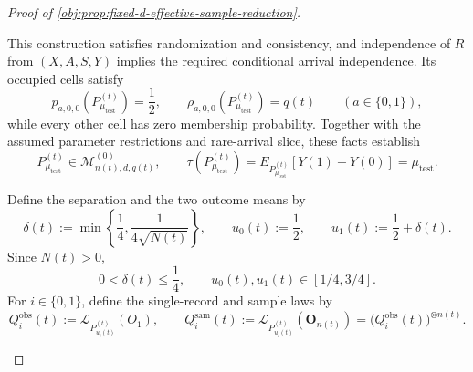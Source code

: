 \documentclass[11pt]{article}
\begin{document}
\begin{proof}[Proof of \cref{obj:prop:fixed-d-effective-sample-reduction}]
\begin{enumerate}
This construction satisfies randomization and consistency, and independence
of \(R\) from \((X,A,S,Y)\) implies the required conditional arrival independence.
Its occupied cells satisfy
\[
p_{a,0,0}(P_{\mu_{\mathrm{test}}}^{(t)})=\frac12,
\qquad
\rho_{a,0,0}(P_{\mu_{\mathrm{test}}}^{(t)})=q(t)
\qquad(a\in\{0,1\}),
\]
while every other cell has zero membership probability. Together with the
assumed parameter restrictions and rare-arrival slice, these facts establish
\[
P_{\mu_{\mathrm{test}}}^{(t)}\in\mathcal M^{(0)}_{n(t),d,q(t)},
\qquad
\tau(P_{\mu_{\mathrm{test}}}^{(t)})
=
E_{P_{\mu_{\mathrm{test}}}^{(t)}}[Y(1)-Y(0)]
=
\mu_{\mathrm{test}}.
\]

Define the separation and the two outcome means by
\[
\delta(t)
:=
\min\left\{\frac14,\frac{1}{4\sqrt{N(t)}}\right\},
\qquad
u_0(t):=\frac12,
\qquad
u_1(t):=\frac12+\delta(t).
\]
Since \(N(t)>0\),
\[
0<\delta(t)\le\frac14,
\qquad
u_0(t),u_1(t)\in[1/4,3/4].
\]
For \(i\in\{0,1\}\), define the single-record and sample laws by
\[
Q_i^{\mathrm{obs}}(t)
:=
\mathcal L_{P_{u_i(t)}^{(t)}}(O_1),
\qquad
Q_i^{\mathrm{sam}}(t)
:=
\mathcal L_{P_{u_i(t)}^{(t)}}(\mathbf O_{n(t)})
=
\bigl(Q_i^{\mathrm{obs}}(t)\bigr)^{\otimes n(t)}.
\]


\end{enumerate}
\end{proof}
\end{document}
